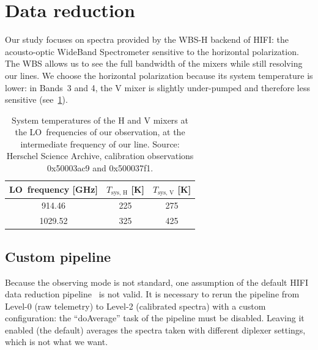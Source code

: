 \FloatBarrier
\section{Data reduction}
\label{sec:s140_data_reduction}
Our study focuses on spectra provided by the WBS-H backend of HIFI: the acousto-optic WideBand Spectrometer sensitive to the horizontal polarization.
The WBS allows us to see the full bandwidth of the mixers while still resolving our lines.
We choose the horizontal polarization because its system temperature is lower: in Bands~3 and 4, the V mixer is slightly under-pumped and therefore less sensitive (see~\cref{tab:chapter5_tsys}).

\begin{table}
    \centering
    \begin{tabular}{ccc}
        \toprule
        LO~frequency [\si{\giga\hertz}] &
        $T_\text{sys, H}$ [\si{\kelvin}] &
        $T_\text{sys, V}$ [\si{\kelvin}]\\
        \midrule
        \num{914.46}   &   225   &   275 \\ %
        \num{1029.52}  &   325   &   425 \\ %
        \bottomrule
    \end{tabular}
    \caption{
        System temperatures of the H and V mixers at the LO~frequencies of our observation, at the intermediate frequency of our line.
        Source: Herschel Science Archive, calibration observations 0x50003ac9
        and 0x500037f1.
    }
    \label{tab:chapter5_tsys}
\end{table}



\subsection{Custom pipeline}

Because the observing mode is not standard, one assumption of the default HIFI data reduction pipeline~\parencite{hifiobserversmanual} is not valid.
It is necessary to rerun the pipeline from Level-0 (raw telemetry) to Level-2 (calibrated spectra) with a custom configuration:
the ``doAverage'' task of the pipeline must be disabled.
Leaving it enabled (the default) averages the spectra taken with different diplexer settings, which is not what we want.



